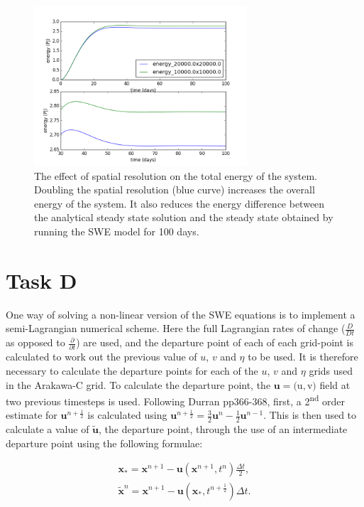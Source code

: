 \documentclass{article}
\newcommand{\ts}{\textsuperscript}
\begin{document}
\begin{figure}[ht!]
    \centering
    \includegraphics[width=300px]{figures/task_b_energy}
    \caption{The effect of spatial resolution on the total energy of the system. Doubling the
    spatial resolution (blue curve) increases the overall energy of the system. It also reduces the
energy difference between the analytical steady state solution and the steady state obtained by
running the SWE model for 100 days.}
    \label{fig:task_b_energy}
\end{figure}


\section*{Task D}

One way of solving a non-linear version of the SWE equations is to implement a semi-Lagrangian
numerical scheme. Here the full Lagrangian rates of change ($\frac{D}{Dt}$ as opposed to
$\frac{\partial}{\partial t}$) are used, and the departure point of each of each grid-point is
calculated to work out the previous value of $u$, $v$ and $\eta$ to be used. It is therefore
necessary to calculate the departure points for each of the $u$, $v$ and $\eta$ grids used in the
Arakawa-C grid.  To calculate the departure point, the $\boldsymbol{u} =  ($u$, $v$)$ field at two
previous timesteps is used. Following Durran pp366-368, first, a 2\ts{nd} order estimate for
$\boldsymbol{u}^{n + \frac{1}{2}}$ is calculated using $\boldsymbol{u}^{n + \frac{1}{2}} =
\frac{3}{2}  \boldsymbol{u}^{n} - \frac{1}{2} \boldsymbol{u}^{n-1}$. This is then used to calculate
a value of $\tilde{\boldsymbol{u}}$, the departure point, through the use of an intermediate
departure point using the following formulae:

\begin{align}
    \label{eqn:sl_update1} 
    \boldsymbol{x_{*}} = \boldsymbol{x}^{n+1} - \boldsymbol{u}(\boldsymbol{x}^{n+1}, t^n)
    \frac{\Delta t}{2},\\
    \label{eqn:sl_update2} 
    \boldsymbol{\tilde{x}}^n = \boldsymbol{x}^{n+1} - \boldsymbol{u}(\boldsymbol{x_{*}},
    t^{n+\frac{1}{2}}) \Delta t.\\
\end{align}
\end{document}
